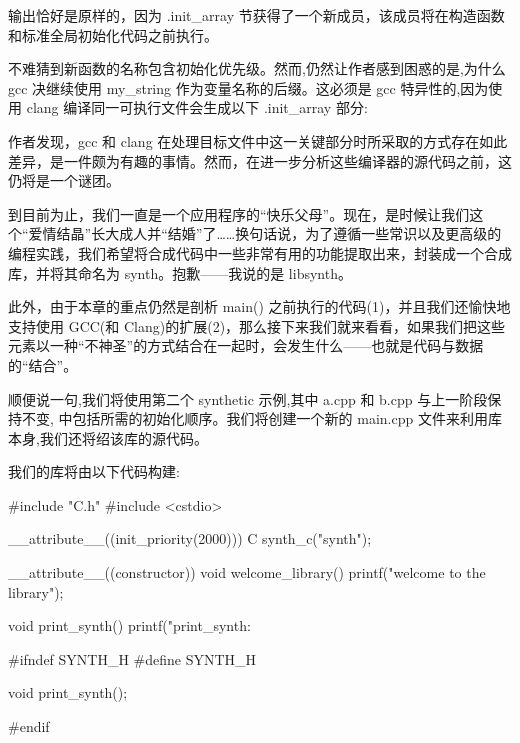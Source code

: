 
输出恰好是原样的，因为 .init\_array 节获得了一个新成员，该成员将在构造函数和标准全局初始化代码之前执行。

不难猜到新函数的名称包含初始化优先级。然而,仍然让作者感到困惑的是,为什么 gcc 决继续使用 my\_string 作为变量名称的后缀。这必须是 gcc 特异性的,因为使用 clang 编译同一可执行文件会生成以下 .init\_array 部分:


作者发现，gcc 和 clang 在处理目标文件中这一关键部分时所采取的方式存在如此差异，是一件颇为有趣的事情。然而，在进一步分析这些编译器的源代码之前，这仍将是一个谜团。


到目前为止，我们一直是一个应用程序的“快乐父母”。现在，是时候让我们这个“爱情结晶”长大成人并“结婚”了……换句话说，为了遵循一些常识以及更高级的编程实践，我们希望将合成代码中一些非常有用的功能提取出来，封装成一个合成库，并将其命名为 synth。抱歉——我说的是 libsynth。

此外，由于本章的重点仍然是剖析 main() 之前执行的代码(1)，并且我们还愉快地支持使用 GCC(和 Clang)的扩展(2)，那么接下来我们就来看看，如果我们把这些元素以一种“不神圣”的方式结合在一起时，会发生什么——也就是代码与数据的“结合”。

顺便说一句,我们将使用第二个 synthetic 示例,其中 a.cpp 和 b.cpp 与上一阶段保持不变, 中包括所需的初始化顺序。我们将创建一个新的 main.cpp 文件来利用库本身,我们还将绍该库的源代码。

我们的库将由以下代码构建:


\begin{cpp}
#include "C.h"
#include <cstdio>

__attribute__((init_priority(2000))) C synth_c("synth");

__attribute__((constructor)) void welcome_library() {
  printf("welcome to the library\n");
}

void print_synth() {
  printf("print_synth: %
}
\end{cpp}


\begin{cpp}
#ifndef SYNTH_H
#define SYNTH_H

void print_synth();

#endif
\end{cpp}

